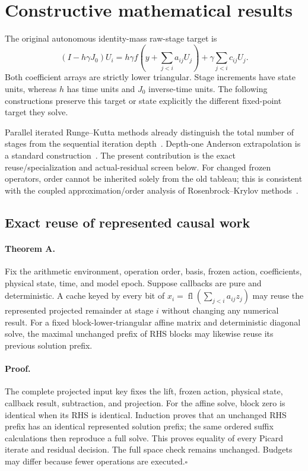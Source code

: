 \section{Constructive mathematical results}

The original autonomous identity-mass raw-stage target is
\begin{equation}
 (I-h\gamma J_0)U_i=h\gamma f\left(y+\sum_{j<i}a_{ij}U_j\right)
 +\gamma\sum_{j<i}c_{ij}U_j.\label{eq:df-target}
\end{equation}
Both coefficient arrays are strictly lower triangular. Stage increments
have state units, whereas $h$ has time units and $J_0$ inverse-time units.
The following constructions preserve this target or state explicitly the
different fixed-point target they solve.

Parallel iterated Runge--Kutta methods already distinguish the total number
of stages from the sequential iteration depth~\cite{vdH1991}.
Depth-one Anderson extrapolation is a standard construction~\cite{pollock2021}.
The present contribution is the exact reuse/specialization and actual-residual
screen below. For changed frozen operators, order cannot be inherited solely
from the old tableau; this is consistent with the coupled approximation/order
analysis of Rosenbrock--Krylov methods~\cite{tranquilli2014}.

\subsection{Exact reuse of represented causal work}

\paragraph{Theorem A.}
Fix the arithmetic environment, operation order, basis, frozen action,
coefficients, physical state, time, and model epoch. Suppose callbacks are
pure and deterministic. A cache keyed by every bit of
$x_i=\operatorname{fl}(\sum_{j<i}a_{ij}z_j)$ may reuse the represented
projected remainder at stage $i$ without changing any numerical result.
For a fixed block-lower-triangular affine matrix and deterministic diagonal
solve, the maximal unchanged prefix of RHS blocks may likewise reuse its
previous solution prefix.

\paragraph{Proof.}
The complete projected input key fixes the lift, frozen action, physical
state, callback result, subtraction, and projection. For the affine solve,
block zero is identical when its RHS is identical. Induction proves that
an unchanged RHS prefix has an identical represented solution prefix;
the same ordered suffix calculations then reproduce a full solve. This
proves equality of every Picard iterate and residual decision. The full
space check remains unchanged. Budgets may differ because fewer operations
are executed.\hfill$\square$

